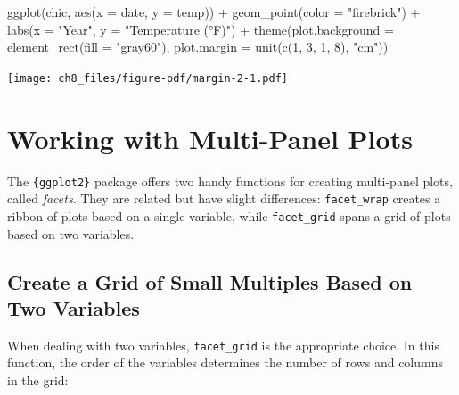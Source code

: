\documentclass[
  letterpaper,
  DIV=11,
  numbers=noendperiod]{scrreprt}
\newenvironment{Shaded}{\begin{snugshade}}{\end{snugshade}}
\newcommand{\AttributeTok}[1]{\textcolor[rgb]{0.40,0.45,0.13}{#1}}
\newcommand{\DecValTok}[1]{\textcolor[rgb]{0.68,0.00,0.00}{#1}}
\newcommand{\FunctionTok}[1]{\textcolor[rgb]{0.28,0.35,0.67}{#1}}
\newcommand{\NormalTok}[1]{\textcolor[rgb]{0.00,0.23,0.31}{#1}}
\newcommand{\SpecialCharTok}[1]{\textcolor[rgb]{0.37,0.37,0.37}{#1}}
\newcommand{\StringTok}[1]{\textcolor[rgb]{0.13,0.47,0.30}{#1}}
\begin{document}
\begin{Shaded}
\begin{Highlighting}[]
\FunctionTok{ggplot}\NormalTok{(chic, }\FunctionTok{aes}\NormalTok{(}\AttributeTok{x =}\NormalTok{ date, }\AttributeTok{y =}\NormalTok{ temp)) }\SpecialCharTok{+}
  \FunctionTok{geom\_point}\NormalTok{(}\AttributeTok{color =} \StringTok{"firebrick"}\NormalTok{) }\SpecialCharTok{+}
  \FunctionTok{labs}\NormalTok{(}\AttributeTok{x =} \StringTok{"Year"}\NormalTok{, }\AttributeTok{y =} \StringTok{"Temperature (°F)"}\NormalTok{) }\SpecialCharTok{+}
  \FunctionTok{theme}\NormalTok{(}\AttributeTok{plot.background =} \FunctionTok{element\_rect}\NormalTok{(}\AttributeTok{fill =} \StringTok{"gray60"}\NormalTok{),}
        \AttributeTok{plot.margin =} \FunctionTok{unit}\NormalTok{(}\FunctionTok{c}\NormalTok{(}\DecValTok{1}\NormalTok{, }\DecValTok{3}\NormalTok{, }\DecValTok{1}\NormalTok{, }\DecValTok{8}\NormalTok{), }\StringTok{"cm"}\NormalTok{))}
\end{Highlighting}
\end{Shaded}

\texttt{[image: ch8\_files/figure-pdf/margin-2-1.pdf]}


\chapter{Working with Multi-Panel Plots}\label{panels}

The \texttt{\{ggplot2\}} package offers two handy functions for creating
multi-panel plots, called \emph{facets}. They are related but have
slight differences: \texttt{facet\_wrap} creates a ribbon of plots based
on a single variable, while \texttt{facet\_grid} spans a grid of plots
based on two variables.

\section{Create a Grid of Small Multiples Based on Two
Variables}\label{create-a-grid-of-small-multiples-based-on-two-variables}

When dealing with two variables, \texttt{facet\_grid} is the appropriate
choice. In this function, the order of the variables determines the
number of rows and columns in the grid:
\end{document}
